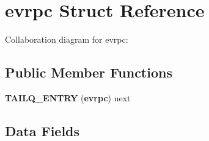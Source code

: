 \section{evrpc \-Struct \-Reference}
\label{structevrpc}


\-Collaboration diagram for evrpc\-:
\subsection*{\-Public \-Member \-Functions}
\begin{DoxyCompactItemize}
\item 
{\bfseries \-T\-A\-I\-L\-Q\-\_\-\-E\-N\-T\-R\-Y} ({\bf evrpc}) next\label{structevrpc_af0ffc39385684dbdb8935a2a4413686a}

\end{DoxyCompactItemize}
\subsection*{\-Data \-Fields}
